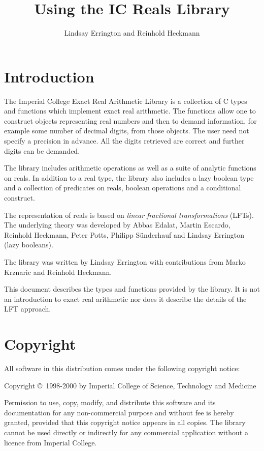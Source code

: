 \documentclass[a4paper,12pt]{article}
\title{Using the IC Reals Library}
\author{Lindsay Errington and Reinhold Heckmann}
\begin{document}
\maketitle
\newcommand{\Type}[1]{\texttt{#1}}
\newcommand{\Name}[1]{\texttt{#1}}
\newcommand{\Var}[1]{\textit{#1}}
\newcommand{\File}[1]{\textsf{#1}}

\section{Introduction}
The Imperial College Exact Real Arithmetic Library
is a collection of C types and functions
which implement exact real arithmetic. The functions
allow one to construct objects representing real numbers
and then to demand information, for example some number
of decimal digits, from those objects. The user need not specify a precision
in advance. All the digits retrieved are correct and further digits
can be demanded.

The library includes arithmetic operations as
well as a suite of analytic functions on reals.
In addition to a real type, the library also includes a lazy boolean
type and a collection of predicates on reals, boolean operations
and a conditional construct.

The representation of reals is based on \emph{linear fractional
transformations} (LFTs).  The underlying theory was developed by
Abbas Edalat, Martin Escardo, Reinhold Heckmann, Peter Potts, Philipp
S\"{u}nderhauf and Lindsay Errington (lazy booleans).

The library was written by Lindsay Errington with contributions from Marko
Krznaric and Reinhold Heckmann.


This document describes the types and functions provided by the
library. It is not an introduction to
exact real arithmetic nor does it describe the details of
the LFT approach.

\section{Copyright}

All software in this distribution comes under the following copyright notice:

Copyright \copyright\ 1998-2000 by Imperial College of Science, Technology
and Medicine

Permission to use, copy, modify, and distribute this software and its
documentation for any non-commercial purpose and without fee is hereby
granted, provided that this copyright notice appears in all copies.
The library cannot be used directly or indirectly for any commercial
application without a licence from Imperial College.
\end{document}
